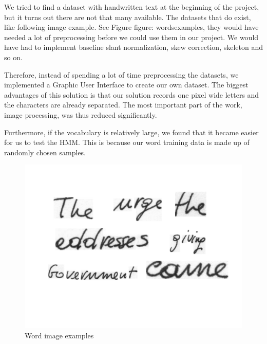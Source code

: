 
We tried to find a dataset with handwritten text at the beginning of the project, but it turns out there are not that many available. 
The datasets that do exist, like following image example. See Figure {figure: wordsexamples}, they would have needed a lot of preprocessing before we could use them in our project.
We would have had to implement baseline slant normalization, skew correction, skeleton and so on.

Therefore, instead of spending a lot of time preprocessing the datasets, we implemented a Graphic User Interface to create our own dataset.
The biggest advantages of this solution is that our solution records one pixel wide letters and the characters are already separated. 
The most important part of the work, image processing, was thus reduced significantly.



Furthermore, if the vocabulary is relatively large, we found that it became easier for us to test the HMM.
This is because our word training data is made up of randomly chosen samples.

\begin{figure}[h!]
  \centering
  \includegraphics[width=5in]{datasets_examples}
  \caption{Word image examples}
  \label{figure:wordsexamples}
\end{figure}
